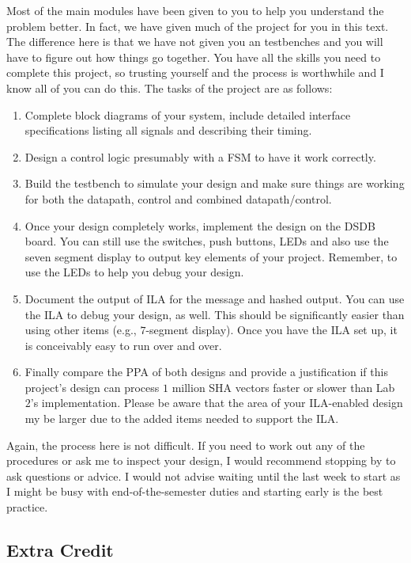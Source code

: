 \documentclass{article}
\begin{document}
Most of the main modules have been given to you to help you understand the
problem better.   In fact, we have given much of the project for you
in this text.  The difference here is that we have not given you an
testbenches and you will have to figure out how things go together.
You have all the skills you need to complete this project, so trusting
yourself and the process is worthwhile and I know all of you can do
this.  The tasks of the project are as follows:
\begin{enumerate}
  \item Complete block diagrams of your system, include detailed
    interface specifications listing all signals and describing their
    timing.
  \item Design a control logic presumably with a FSM to have it work
  correctly.
\item  Build the testbench to simulate your design and make sure
  things are working for both the datapath, control and combined
  datapath/control.    
  \item Once your design completely works, implement the design on
    the DSDB board.  You can still use the switches, push
    buttons, LEDs and also use the
    seven segment display to output key elements of your project.
    Remember, to use the LEDs to help you debug your design.
  \item Document the output of ILA for the message and hashed output.
    You can use the ILA to debug your design, as well.  This should be
    significantly easier than using other items (e.g., $7$-segment
    display).  Once you have the ILA set up, it is conceivably easy to
    run over and over.
  \item Finally compare the PPA of both designs and provide a
    justification if this project's design can process $1$ million SHA
    vectors faster or slower than Lab~$2$'s implementation.  Please be
    aware that the area of your ILA-enabled design my be larger due to
    the added items needed to support the ILA.
\end{enumerate}

Again, the process here is not difficult.  If you need to work out any
of the procedures or ask me to inspect your design, I would recommend
stopping by to ask questions or advice.  I would not advise waiting
until the last week to start as I might be busy with
end-of-the-semester duties and starting early is the best practice.

\subsection{Extra Credit}
\end{document}

